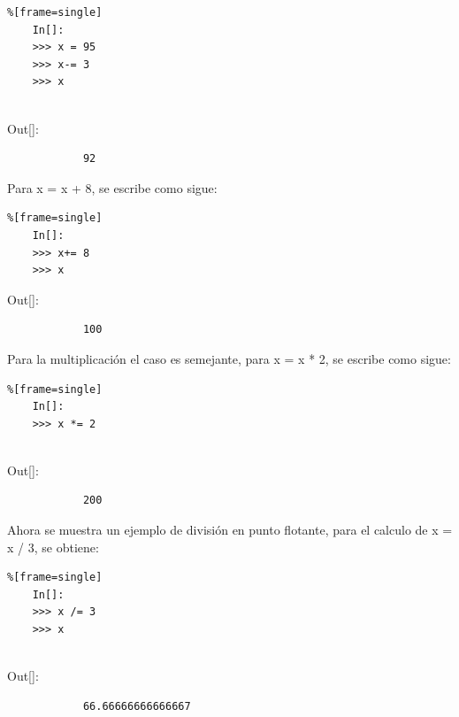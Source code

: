 \begin{lstlisting}%[frame=single]
	In[]:	
	>>> x = 95
	>>> x-= 3
	>>> x
	
\end{lstlisting}

{\ttfamily\scriptsize\scriptsize 
	\hspace{-0.65cm}Out[]:\vspace{-0.15cm}	
	{\color{blue} 	
		\begin{verbatim}
			92
		\end{verbatim}
}}

Para  {\ttfamily x = x + 8}, se escribe como sigue:

\begin{lstlisting}%[frame=single]
	In[]:
	>>> x+= 8
	>>> x	
\end{lstlisting}

{\ttfamily\scriptsize\scriptsize 
	\hspace{-0.65cm}Out[]:\vspace{-0.15cm}	
	{\color{blue} 	
		\begin{verbatim}
			100
		\end{verbatim}
}}

Para la multiplicación el caso es semejante, para {\ttfamily  x = x * 2}, se escribe como sigue: 

\begin{lstlisting}%[frame=single]
	In[]:	
	>>> x *= 2
	
\end{lstlisting}

{\ttfamily\scriptsize\scriptsize 
	\hspace{-0.65cm}Out[]:\vspace{-0.15cm}	
	{\color{blue} 	
		\begin{verbatim}
			200
		\end{verbatim}
}}

Ahora se muestra un ejemplo de división en punto flotante, para el calculo de  {\ttfamily  x = x / 3}, se obtiene:

\begin{lstlisting}%[frame=single]
	In[]:	
	>>> x /= 3
	>>> x
	
\end{lstlisting}
\vspace{-0.25cm}

{\ttfamily\scriptsize\scriptsize 
	\hspace{-0.65cm}Out[]:	
	{\color{blue} 	
		\begin{verbatim}
			66.66666666666667
		\end{verbatim}
}}


